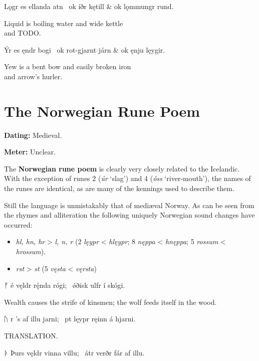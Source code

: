 \bvg\bva Lǫgr es ellanda atn \hld\ ok íðr kętill &
\ind ok lǫmmungr rund.\eva

\bvb Liquid is boiling water and wide kettle \\
and TODO.\evb\evg


\bvg\bva Ýr es ęndr bogi \hld\ ok rot-gjarnt járn &
\ind ok ęnju lęygir.\eva

\bvb Yew is a bent bow and easily broken iron \\
and arrow’s hurler.\evb\evg

\sectionline

\section{The Norwegian Rune Poem}\chapterStart{}

\begin{flushright}%
\textbf{Dating:} Medieval.%

\textbf{Meter:} Unclear.
\end{flushright}%

The \textbf{Norwegian rune poem} is clearly very closely related to the Icelandic.  With the exception of runes 2 (\emph{úr} ‘slag’) and 4 (\emph{óss} ‘river-mouth’), the names of the runes are identical, as are many of the kennings used to describe them.

Still the language is unmistakably that of mediæval Norway.  As can be seen from the rhymes and alliteration the following uniquely Norwegian sound changes have occurred:
\begin{itemize}
  \item \emph{hl, hn, hr} > \emph{l, n, r} (2 \emph{lęypr} < \emph{hlęypr}; 8 \emph{nęppa} < \emph{hnęppa}; 5 \emph{rossum} < \emph{hrossum}).
  \item \emph{rst} > \emph{st} (5 \emph{vęsta} < \emph{vęrsta})
\end{itemize}

\sectionline

\bvg\bva ᚠ é vęldr rę́nda rógi; \hld\ ǿðisk ulfr í skógi.\eva

\bvb Wealth causes the strife of kinsmen; the wolf feeds itself in the wood.\evb\evg


\bvg\bva ᚢ r ’s af illu jarni; \hld\ pt lęypr ręinn á hjarni.\eva

\bvb TRANSLATION.\evb\evg


\bvg\bva ᚦ Þurs vęldr vinna villu; \hld\ átr verðr fár af illu.\eva


